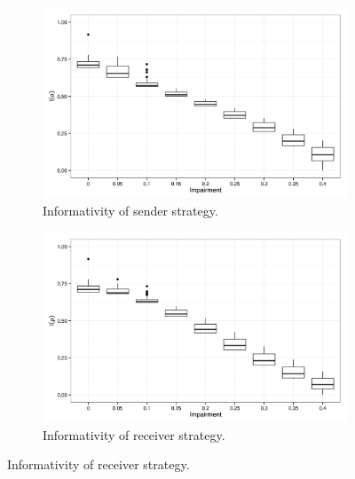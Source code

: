 \begin{figure}
        \begin{subfigure}{0.45\textwidth}
                \includegraphics[width=\textwidth]{plots/Speaker-informativity-20140121-141158}
                \caption{Informativity of sender strategy.}
        \end{subfigure}
        \begin{subfigure}{0.45\textwidth}
                \includegraphics[width=\textwidth]{plots/Hearer-informativity-20140121-141158}
                \caption{Informativity of receiver strategy.}
        \end{subfigure}


\end{figure}
